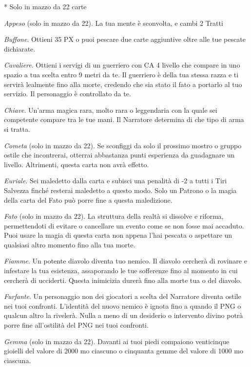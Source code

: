 \begin{multicols}{2}

\medskip

* Solo in mazzo da 22 carte

\textit{Appeso} (solo in mazzo da 22). La tua mente è sconvolta, e cambi 2 Tratti

\textit{Buffone}. Ottieni 35 PX o puoi pescare due carte aggiuntive oltre alle tue pescate dichiarate.

\textit{Cavaliere}. Ottieni i servigi di un guerriero con CA 4 livello che compare in uno spazio a tua scelta entro 9 metri da te. Il guerriero è della tua stessa razza e ti servirà lealmente fino alla morte, credendo che sia stato il fato a portarlo al tuo servizio. Il personaggio è controllato da te.

\textit{Chiave}. Un'arma magica rara, molto rara o leggendaria con la quale sei competente compare tra le tue mani. Il Narratore determina di che tipo di arma si tratta.

\textit{Cometa} (solo in mazzo da 22). Se sconfiggi da solo il prossimo mostro o gruppo ostile che incontrerai, otterrai abbastanza punti esperienza da guadagnare un livello. Altrimenti, questa carta non avrà effetto.

\textit{Euriale}. Sei maledetto dalla carta e subisci una penalità di -2 a tutti i Tiri Salvezza finché resterai maledetto a questo modo. Solo un Patrono o la magia della carta del Fato può porre fine a questa maledizione.

\textit{Fato} (solo in mazzo da 22). La struttura della realtà si dissolve e riforma, permettendoti di evitare o cancellare un evento come se non fosse mai accaduto. Puoi usare la magia di questa carta non appena l'hai pescata o aspettare un qualsiasi altro momento fino alla tua morte.

\textit{Fiamme}. Un potente diavolo diventa tuo nemico. Il diavolo cercherà di rovinare e infestare la tua esistenza, assaporando le tue sofferenze fino al momento in cui cercherà di ucciderti. Questa inimicizia durerà fino alla morte tua o del diavolo.

\textit{Furfante}. Un personaggio non dei giocatori a scelta del Narratore diventa ostile nei tuoi confronti. L'identità del nuovo nemico è ignota fino a quando il PNG o qualcun altro la rivelerà. Nulla a meno di un desiderio o intervento divino potrà porre fine all'ostilità del PNG nei tuoi confronti.

\textit{Gemma} (solo in mazzo da 22). Davanti ai tuoi piedi compaiono venticinque gioielli del valore di 2000 mo ciascuno o cinquanta gemme del valore di 1000 mo ciascuna.


\end{multicols}
